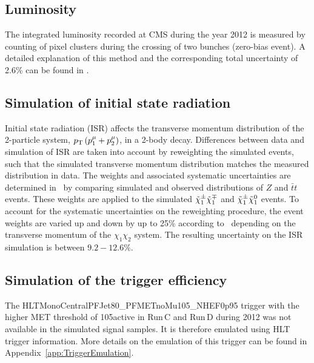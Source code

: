 \subsection*{Luminosity}
The integrated luminosity recorded at CMS during the year 2012 is measured by counting of pixel clusters during the crossing of two bunches (zero-bias event).
A detailed explanation of this method and the corresponding total uncertainty of 2.6\% can be found in \cite{bib:CMS:Lumi_PAS}.

\subsection*{Simulation of initial state radiation}
Initial state radiation (ISR) affects the transverse momentum distribution of the 2-particle system, $p_{\text{T}}\left(p_1^{\mu} + p_2^{\mu} \right)$, in a 2-body decay.
Differences between data and simulation of ISR are taken into account by reweighting the simulated events, such that the simulated transverse momentum distribution matches the measured distribution in data. 
The weights and associated systematic uncertainties are determined in~\cite{bib:CMS:ISR_AN} by comparing simulated and observed \pt distributions of $Z$ and $\bar{t}t$ events.
These weights are applied to the simulated $\tilde{\chi}^{\pm}_{1}\tilde{\chi}^{\mp}_{1}$ and $\tilde{\chi}^{\pm}_{1}\tilde{\chi}^{0}_{1}$ events.
To account for the systematic uncertainties on the reweighting procedure, the event weights are varied up and down by up to 25\% according to~\cite{bib:CMS:ISR_AN} depending on the transverse momentum of the $\chi_1\chi_2$ system.
The resulting uncertainty on the ISR simulation is between $9.2-12.6\%$.

\subsection*{Simulation of the trigger efficiency}
The HLTMonoCentralPFJet80\_PFMETnoMu105\_NHEF0p95 trigger with the higher MET threshold of 105\gev active in Run\,C and Run\,D during 2012 was not available in the simulated signal samples.
It is therefore emulated using HLT trigger information. 
More details on the emulation of this trigger can be found in Appendix~\ref{app:TriggerEmulation}.

